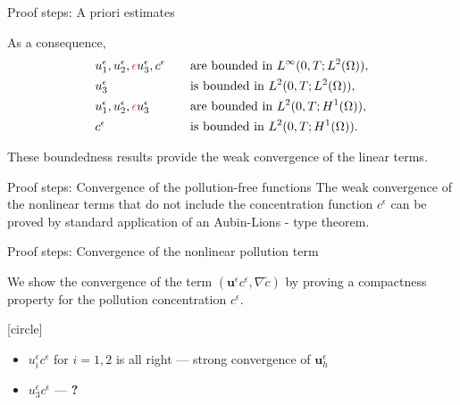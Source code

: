 \documentclass{beamer}
\begin{document}
\begin{frame}{Proof steps: A priori estimates}

As a consequence,
\begin{align}
& u^\epsilon_1, u^\epsilon_2, \textcolor{jasper}{\epsilon} u^\epsilon_3, c^\epsilon & \quad & \text{are bounded in $L^\infty (0,T; L^2(\Omega)),$} \nonumber \\
& u^\epsilon_3 & \quad & \text{is bounded in $L^2 (0,T; L^2(\Omega)),$} \nonumber \\
& u^\epsilon_1, u^\epsilon_2, \textcolor{jasper}{\epsilon} u^\epsilon_3 & \quad & \text{are bounded in $L^2(0,T; H^1(\Omega)),$} \nonumber \\
& c^\epsilon & \quad & \text{is bounded in $L^2(0,T;H^1(\Omega)).$} \nonumber
\end{align}

These boundedness results provide the weak convergence of the linear terms.
\end{frame}

\begin{frame}{Proof steps: Convergence of the pollution-free functions}
The weak convergence of the nonlinear terms that do not include the concentration function $c^\epsilon$ can be proved by standard application of an Aubin-Lions - type theorem.
\end{frame}

\begin{frame}{Proof steps: Convergence of the nonlinear pollution term}

We show the convergence of the term $(\mathbf{u}^\epsilon c^\epsilon, \nabla \tilde{c})$ by proving a compactness property for the pollution concentration $c^\epsilon.$

[circle]
\begin{itemize}

\item $u^\epsilon_i c^\epsilon$ for $i = 1,2$ is all right --- strong convergence of $\mathbf{u}^\epsilon_h$

\end{itemize}

\begin{itemize}
\item \textcolor{mediumred-violet}{$u^\epsilon_3 c^\epsilon$} --- \textbf{?}

\end{itemize}

\end{frame}
\end{document}
